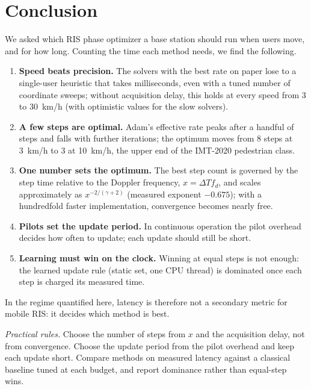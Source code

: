\section{Conclusion}
\label{sec:conclusion}

We asked which RIS phase optimizer a base station should run when users move, and for how long. Counting the time each method needs, we find the following.
\begin{enumerate}
    \item \textbf{Speed beats precision.} The solvers with the best rate on paper lose to a single-user heuristic that takes milliseconds, even with a tuned number of coordinate sweeps; without acquisition delay, this holds at every speed from 3 to 30~km/h (with optimistic values for the slow solvers).
    \item \textbf{A few steps are optimal.} Adam's effective rate peaks after a handful of steps and falls with further iterations; the optimum moves from 8 steps at 3~km/h to 3 at 10~km/h, the upper end of the IMT-2020 pedestrian class.
    \item \textbf{One number sets the optimum.} The best step count is governed by the step time relative to the Doppler frequency, $x=\Delta T f_d$, and scales approximately as $x^{-2/(\gamma+2)}$ (measured exponent $-0.675$); with a hundredfold faster implementation, convergence becomes nearly free.
    \item \textbf{Pilots set the update period.} In continuous operation the pilot overhead decides how often to update; each update should still be short.
    \item \textbf{Learning must win on the clock.} Winning at equal steps is not enough: the learned update rule (static set, one CPU thread) is dominated once each step is charged its measured time.
\end{enumerate}
In the regime quantified here, latency is therefore not a secondary metric for mobile RIS: it decides which method is best.

\emph{Practical rules.} Choose the number of steps from $x$ and the acquisition delay, not from convergence. Choose the update period from the pilot overhead and keep each update short. Compare methods on measured latency against a classical baseline tuned at each budget, and report dominance rather than equal-step wins.

